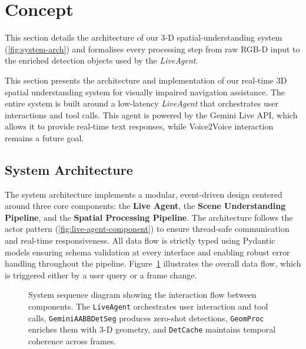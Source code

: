 \section{Concept}


This section details the architecture of our 3-D spatial-understanding system (\autoref{fig:system-arch}) and formalises every processing step from raw RGB-D input to the enriched detection objects used by the \emph{Live\-Agent}. %

This section presents the architecture and implementation of our real-time 3D spatial understanding system for visually impaired navigation assistance. The entire system is built around a low-latency \emph{LiveAgent} that orchestrates user interactions and tool calls. This agent is powered by the Gemini Live API, which allows it to provide real-time text responses, while Voice2Voice interaction remains a future goal.

\subsection{System Architecture}\label{subsec:architecture}

The system architecture implements a modular, event-driven design centered around three core components: the \textbf{Live Agent}, the \textbf{Scene Understanding Pipeline}, and the \textbf{Spatial Processing Pipeline}. The architecture follows the actor pattern (\autoref{fig:live-agent-component}) to ensure thread-safe communication and real-time responsiveness. All data flow is strictly typed using Pydantic models ensuring schema validation at every interface and enabling robust error handling throughout the pipeline. Figure~\ref{fig:system-arch} illustrates the overall data flow, which is triggered either by a user query or a frame change.

\begin{figure}[t]
    \centering
    \resizebox{\linewidth}{!}{%
        
    }
    \caption{System sequence diagram showing the interaction flow between components. The \texttt{LiveAgent} orchestrates user interaction and tool calls, \texttt{GeminiAABBDetSeg} produces zero-shot detections, \texttt{GeomProc} enriches them with 3-D geometry, and \texttt{DetCache} maintains temporal coherence across frames.}
    \label{fig:system-arch}
\end{figure}

